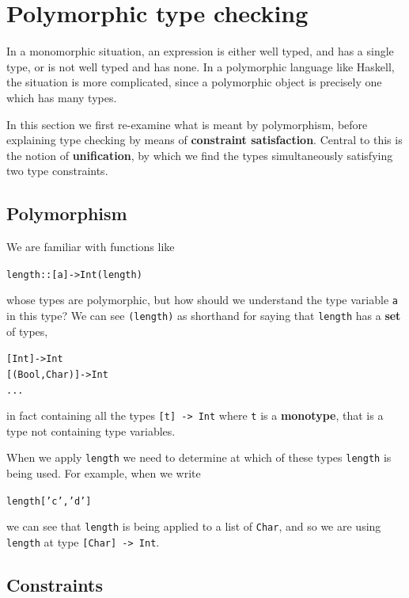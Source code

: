 \section{Polymorphic type checking}
\label{polyTypeCheck}

In a monomorphic situation, an expression is either well typed, and has
a single type, or is not well typed and has none. In a polymorphic
language like Haskell, the situation is more complicated, since a
polymorphic object is precisely one which has many types. 

In this section we first re-examine what is meant by polymorphism,
before explaining type checking by means of \textbf{constraint satisfaction}.
Central to this is the notion of \textbf{unification}, by which we find
the types simultaneously satisfying two type constraints.


\subsection*{Polymorphism}

We are familiar with functions like
\begin{alltt}
length :: [a] -> Int\hfill(length)
\end{alltt}
whose types are polymorphic, but how should we understand the type
variable \texttt{a} in this type? We can see \texttt{(length)} as
shorthand for saying that \texttt{length} has a \textbf{set} of types,
\begin{alltt}
[Int] -> Int
[(Bool,Char)] -> Int
 ...
\end{alltt}
in fact containing all the types \texttt{[t] -> Int} where \texttt{t} is
a \textbf{monotype}, that is a type not containing type variables.

When we apply \texttt{length} we need to determine at which of these types
\texttt{length}
is being used. For example, when we write
\begin{alltt}
length ['c','d']
\end{alltt}
we can see that \texttt{length}
is being applied to a list of \texttt{Char}, and so we are using
\texttt{length} at type \texttt{[Char] -> Int}.

\subsection*{Constraints}

